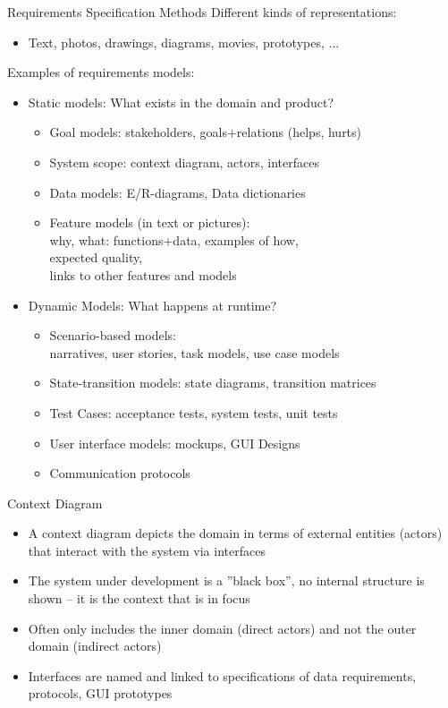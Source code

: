 \documentclass{simpleslides}
\begin{document}
\begin{frame}[fragile]{Requirements Specification Methods}
Different kinds of representations:
\begin{itemize}
\item Text, photos, drawings, diagrams, movies, prototypes, ...
\end{itemize}
Examples of requirements models:
\begin{itemize}
\item Static models: What exists in the domain and product?
\begin{itemize}
\item Goal models: stakeholders, goals+relations (helps, hurts)
\item System scope: context diagram, actors, interfaces
\item Data models: E/R-diagrams, Data dictionaries
\item Feature models (in text or pictures):\\why, what: functions+data, examples of how,\\expected quality,\\links to other features and models
\end{itemize}
\item Dynamic Models: What happens at runtime?
\begin{itemize}
\item Scenario-based models:\\narratives, user stories, task models, use case models
\item State-transition models: state diagrams, transition matrices
\item Test Cases: acceptance tests, system tests, unit tests
\item User interface models: mockups, GUI Designs
\item Communication protocols
\end{itemize}
\end{itemize}
\end{frame}

\begin{frame}[fragile]{Context Diagram}
\begin{itemize}
\item A context diagram depicts the domain in terms of external entities (actors) that interact with the system via interfaces
\item The system under development is a ''black box'', no internal structure is shown -- it is the context that is in focus
\item Often only includes the inner domain (direct actors) and not the outer domain (indirect actors)
\item Interfaces are named and linked to specifications of data requirements, protocols, GUI prototypes
\end{itemize}
\end{frame}
\end{document}
